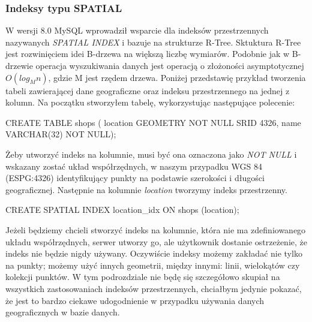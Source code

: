\subsubsection{Indeksy typu SPATIAL}
W wersji 8.0 MySQL wprowadził wsparcie dla indeksów przestrzennych nazywanych \textit{SPATIAL INDEX} i bazuje na strukturze R-Tree. Sktuktura R-Tree jest rozwinięciem idei B-drzewa na większą liczbę wymiarów. Podobnie jak w B-drzewie operacja wyszukiwania danych jest operacją o złożoności asymptotycznej $O(log_M n)$, gdzie M jest rzędem drzewa. Poniżej przedstawię przykład tworzenia tabeli zawierającej dane geograficzne oraz indeksu przestrzennego na jednej z kolumn.
Na początku stworzyłem tabelę, wykorzystując następujące polecenie:
\begin{spverbatim}
	CREATE TABLE shops (
	location GEOMETRY NOT NULL SRID 4326,
	name VARCHAR(32) NOT NULL);
\end{spverbatim}
Żeby utworzyć indeks na kolumnie, musi być ona oznaczona jako \textit{NOT NULL} i wskazany zostać układ współrzędnych, w naszym przypadku WGS 84 (ESPG:4326) identyfikujący punkty na podstawie szerokości i długości geograficznej. Następnie na kolumnie \textit{location} tworzymy indeks przestrzenny.
\begin{spverbatim}
	CREATE SPATIAL INDEX location_idx ON shops (location);
\end{spverbatim}
Jeżeli będziemy chcieli stworzyć indeks na kolumnie, która nie ma zdefiniowanego układu współrzędnych, serwer utworzy go, ale użytkownik dostanie ostrzeżenie, że indeks nie będzie nigdy używany. Oczywiście indeksy możemy zakładać nie tylko na punkty; możemy użyć innych geometrii, między innymi: linii, wielokątów czy kolekcji punktów. W tym podrozdziale nie będę się szczegółowo skupiał na wszystkich zastosowaniach indeksów przestrzennych, chciałbym jedynie pokazać, że jest to bardzo ciekawe udogodnienie w przypadku używania danych geograficznych w bazie danych.
